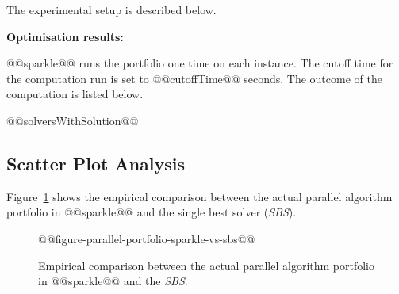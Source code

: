 \documentclass[british]{article}
\newif\ifdecision
\begin{document}
The experimental setup is described below.

\ifdecision \textbf{Performance computation:}
\else \textbf{Optimisation results:}
\fi
@@sparkle@@ runs the portfolio one time on each instance. The cutoff time for the computation run is set to @@cutoffTime@@ seconds. The outcome of the computation is listed below.
\ifdecision
The scores of the outcomes are calculated according to @@performanceMetric@@, this means that for each instance the solver which solved the instance is scored its runtime and the remaining solvers are scored the runtime times ten. If however the portfolio reaches the cutofftime, which means that no solvers solved the instance, all solvers are scored the cutofftime times ten.
\fi

\begin{enumerate}
@@solversWithSolution@@
\end{enumerate}
\ifdecision
In the table below the computed @@performanceMetric@@ scores of all solvers have been listed aswell as for the parallel algorithm portfolio itself.
\begin{table}[ht]
@@resultsTable@@
\end{table}
\fi
\subsection{Scatter Plot Analysis}
\label{sec:Scatter_Plot_Analysis}

Figure~\ref{fig:sparkle_vs_sbs} shows the empirical comparison between the actual parallel algorithm portfolio in @@sparkle@@ and the single best solver (\emph{SBS}).

\begin{figure}[htbp]
\noindent \begin{centering}
    @@figure-parallel-portfolio-sparkle-vs-sbs@@
\par\end{centering}

\caption{Empirical comparison between the actual parallel algorithm portfolio in @@sparkle@@ and the \emph{SBS}.}\label{fig:sparkle_vs_sbs}
\end{figure}



\end{document}
